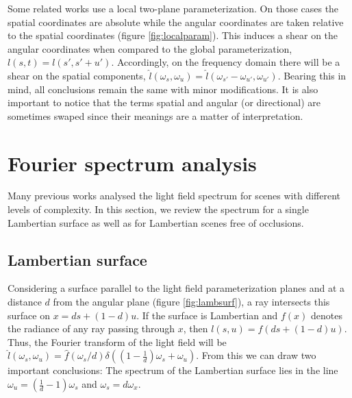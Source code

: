 \documentclass[acmtog,review,anonymous]{acmart}
\begin{document}
Some related works use a local two-plane parameterization\cite{Chai:2000:PS:344779.344932}. On those cases the spatial coordinates are absolute while the angular coordinates are taken relative to the spatial coordinates (figure \ref{fig:localparam}). This induces a shear on the angular coordinates when compared to the global parameterization, $l(s, t) = l(s', s' + u')$. Accordingly, on the frequency domain there will be a shear on the spatial components, $\hat{l}(\omega_{s}, \omega_{u}) = \hat{l}(\omega_{s'} - \omega_{u'}, \omega_{u'})$. Bearing this in mind, all conclusions remain the same with minor modifications. It is also important to notice that the terms spatial and angular (or directional) are sometimes swaped since their meanings are a matter of interpretation.

\section{Fourier spectrum analysis}

Many previous works analysed the light field spectrum for scenes with different levels of complexity\cite{Liang:2015:LTF:2742222.2665075,Chai:2000:PS:344779.344932,Durand:2005:FAL:1073204.1073320,Ng:2005:FSP:1073204.1073256}. In this section, we review the spectrum for a single Lambertian surface as well as for Lambertian scenes free of occlusions.

\subsection{Lambertian surface} \label{subsec:lambsurf}

Considering a surface parallel to the light field parameterization planes and at a distance $d$ from the angular plane (figure \ref{fig:lambsurf}), a ray intersects this surface on $x = ds + (1-d)u$. If the surface is Lambertian and $f(x)$ denotes the radiance of any ray passing through $x$, then $l(s, u) = f(ds + (1-d)u)$. Thus, the Fourier transform of the light field will be $\hat{l}(\omega_{s},\omega_{u}) = \hat{f}(\omega_{s}/d)\delta((1 - \frac{1}{d})\omega_{s} + \omega_{u})$. From this we can draw two important conclusions: The spectrum of the Lambertian surface lies in the line $\omega_{u} = (\frac{1}{d} - 1)\omega_{s}$ and $\omega_{s} = d\omega_{x}$.
\end{document}
